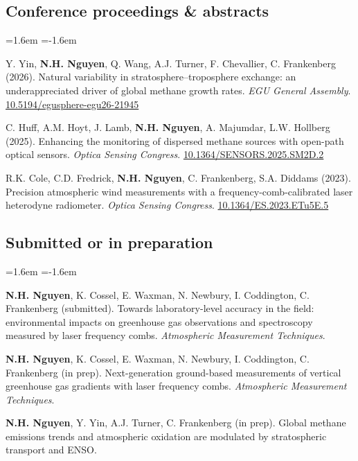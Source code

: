 \documentclass[11pt,letterpaper]{article}
\newcommand{\me}{\textbf{N.H. Nguyen}}
\newenvironment{pubs}
  {\begin{list}{}{\leftmargin=1.6em \itemindent=-1.6em
   \topsep=3pt \itemsep=4pt \parsep=0pt}}
  {\end{list}}
\let\oldsubsection\subsection
\renewcommand{\subsection}[1]{\Needspace*{4\baselineskip}\oldsubsection{#1}}
\begin{document}
\subsection{Conference proceedings \& abstracts}
\begin{pubs}
\item[3.] Y. Yin, \me, Q. Wang, A.J. Turner, F. Chevallier, C. Frankenberg (2026). Natural variability in
  stratosphere--troposphere exchange: an underappreciated driver of global methane growth rates.
  \textit{EGU General Assembly}.
  \href{https://doi.org/10.5194/egusphere-egu26-21945}{10.5194/egusphere-egu26-21945}

\item[2.] C. Huff, A.M. Hoyt, J. Lamb, \me, A. Majumdar, L.W. Hollberg (2025). Enhancing the monitoring of
  dispersed methane sources with open-path optical sensors. \textit{Optica Sensing Congress}.
  \href{https://doi.org/10.1364/SENSORS.2025.SM2D.2}{10.1364/SENSORS.2025.SM2D.2}

\item[1.] R.K. Cole, C.D. Fredrick, \me, C. Frankenberg, S.A. Diddams (2023). Precision atmospheric wind
  measurements with a frequency-comb-calibrated laser heterodyne radiometer.
  \textit{Optica Sensing Congress}.
  \href{https://doi.org/10.1364/ES.2023.ETu5E.5}{10.1364/ES.2023.ETu5E.5}
\end{pubs}

\subsection{Submitted or in preparation}
\begin{pubs}
\item[3.] \me, K. Cossel, E. Waxman, N. Newbury, I. Coddington, C. Frankenberg (submitted). Towards
  laboratory-level accuracy in the field: environmental impacts on greenhouse gas observations and
  spectroscopy measured by laser frequency combs. \textit{Atmospheric Measurement Techniques}.

\item[2.] \me, K. Cossel, E. Waxman, N. Newbury, I. Coddington, C. Frankenberg (in prep).
  Next-generation ground-based measurements of vertical greenhouse gas gradients with laser frequency
  combs. \textit{Atmospheric Measurement Techniques}.

\item[1.] \me, Y. Yin, A.J. Turner, C. Frankenberg (in prep). Global methane emissions trends and
  atmospheric oxidation are modulated by stratospheric transport and ENSO.
\end{pubs}
\end{document}
